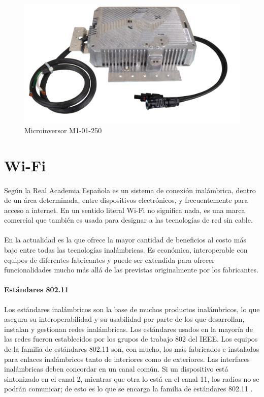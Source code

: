 \begin{figure}[H]
	\centering
	\includegraphics[scale=.25]{Capitulo2/images/microinversor.png}
	\caption{Microinversor M1-01-250}
	\label{fig:diagrama_dispensador}
\end{figure}
 
 
 \section{Wi-Fi}
 \paragraph{}
 Según la Real Academia Española es un sistema de conexión inalámbrica, dentro de un área determinada, entre dispositivos electrónicos, y frecuentemente para acceso a internet. En un sentido literal Wi-Fi no significa nada, es una marca comercial que también es usada para designar a las tecnologías de red sin cable.
 \paragraph{}
 En la actualidad es la que ofrece la mayor cantidad de beneficios al costo más bajo entre todas las tecnologías inalámbricas. Es económica, interoperable con equipos de diferentes fabricantes y puede ser extendida para ofrecer funcionalidades mucho más allá de las previstas originalmente por los fabricantes.
 
 \paragraph{Estándares 802.11}Los estándares inalámbricos son la base de muchos productos inalámbricos, lo que asegura su interoperabilidad y su usabilidad por parte de los que desarrollan, instalan y gestionan redes inalámbricas. Los estándares usados en la mayoría de las redes fueron establecidos por los grupos de trabajo 802 del IEEE. Los equipos de la familia de estándares 802.11 son, con mucho, los más fabricados e instalados para enlaces inalámbricos tanto de interiores como de exteriores. Las interfaces inalámbricas deben concordar en un canal común. Si un dispositivo está sintonizado en el canal 2, mientras que otra lo está en el canal 11, los radios no se podrán comunicar; de esto es lo que se encarga la familia de estándares 802.11 \citep{MarcoTeoricoWifi}.
